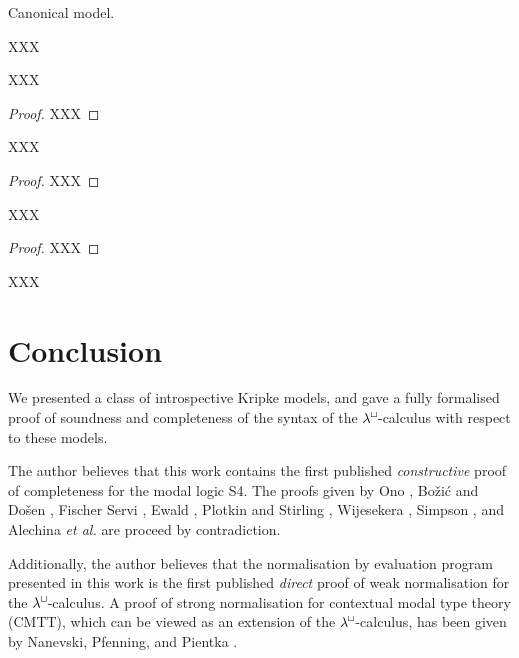 \documentclass{entcs}
\newcommand{\sq}{\mathop{\Box}}
\newcommand{\lambdabox}{\lambda^{\mkern-1mu\sq\mkern-3mu}}
\begin{document}
\begin{definition}
  Canonical model.
  
XXX
\end{definition}


\begin{lemma}
  XXX
\end{lemma}
\begin{proof}
  XXX
\end{proof}


\begin{lemma}
  XXX
\end{lemma}
\begin{proof}
  XXX
\end{proof}


\begin{theorem}[Completeness]
  
XXX
\end{theorem}
\begin{proof}
  XXX
\end{proof}


\begin{corollary}[Normalisation]
  
XXX
\end{corollary}




\section{Conclusion}

We presented a class of introspective Kripke models, and gave a fully formalised proof of soundness and completeness of the syntax of the $\lambdabox$-calculus with respect to these models.

The author believes that this work contains the first published \emph{constructive} proof of completeness for the modal logic S4.  The proofs given by Ono \cite{Ono77}, Bo\v{z}i\'{c} and Do\v{s}en \cite{BozicD84}, Fischer Servi \cite{FischerServi84}, Ewald \cite{Ewald86}, Plotkin and Stirling \cite{PlotkinS86}, Wijesekera \cite{Wijesekera90}, Simpson \cite{Simpson94}, and Alechina \emph{et al.} \cite{AlechinaMPR01} are proceed by contradiction.

Additionally, the author believes that the normalisation by evaluation program presented in this work is the first published \emph{direct} proof of weak normalisation for the $\lambdabox$-calculus.  A proof of strong normalisation for contextual modal type theory (CMTT), which can be viewed as an extension of the $\lambdabox$-calculus, has been given by Nanevski, Pfenning, and Pientka \cite{NanevskiPP08}.
\end{document}
